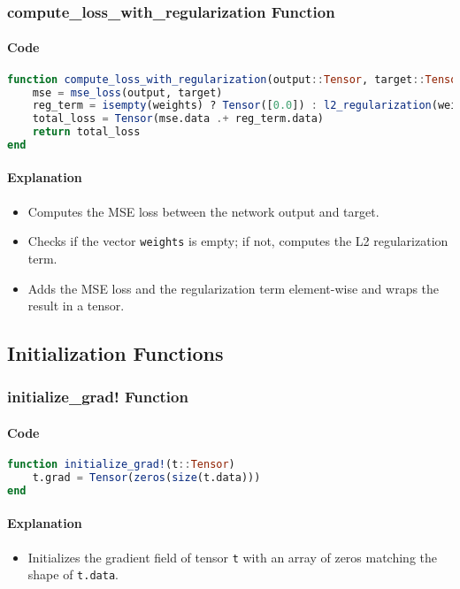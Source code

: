 \documentclass[11pt]{article}
\begin{document}
\subsubsection{compute\_loss\_with\_regularization Function}
\paragraph{Code}
\begin{lstlisting}[language=Julia]
function compute_loss_with_regularization(output::Tensor, target::Tensor, weights::Vector{Tensor}, λ::Float64)::Tensor
    mse = mse_loss(output, target)
    reg_term = isempty(weights) ? Tensor([0.0]) : l2_regularization(weights, λ)
    total_loss = Tensor(mse.data .+ reg_term.data)
    return total_loss
end
\end{lstlisting}

\paragraph{Explanation}
\begin{itemize}
    \item Computes the MSE loss between the network output and target.
    \item Checks if the vector \texttt{weights} is empty; if not, computes the L2 regularization term.
    \item Adds the MSE loss and the regularization term element-wise and wraps the result in a tensor.
\end{itemize}

\subsection{Initialization Functions}
\subsubsection{initialize\_grad! Function}
\paragraph{Code}
\begin{lstlisting}[language=Julia]
function initialize_grad!(t::Tensor)
    t.grad = Tensor(zeros(size(t.data)))
end
\end{lstlisting}

\paragraph{Explanation}
\begin{itemize}
    \item Initializes the gradient field of tensor \texttt{t} with an array of zeros matching the shape of \texttt{t.data}.
\end{itemize}
\end{document}
